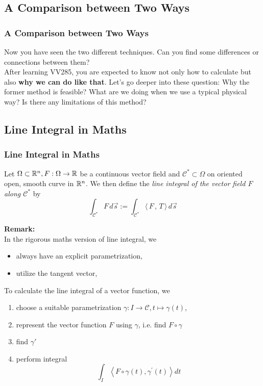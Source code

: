 \documentclass[11pt, t]{beamer}
\renewcommand{\emph}[1]{{\color{Turquoise3}\textsl{#1}}}
\newcommand{\nullspace}{~\\[15pt]}
\newcommand{\Remark}{\textbf{Remark: }}
\newcommand{\scp}[2]{\langle\,#1\,,\,#2\,\rangle} \newcommand{\scpp}{\langle\,\cdot\,,\,\cdot\,\rangle}
\begin{document}
\subsection{A Comparison between Two Ways}
\begin{frame}
    \frametitle{A Comparison between Two Ways}
    Now you have seen the two different techniques. Can you find some differences or connections between them?\nullspace\pause
    After learning VV285, you are expected to know not only how to calculate but also \textbf{why we can do like that}. Let's go deeper into these question: Why the former method is feasible? What are we doing when we use a typical physical way?  Is there any limitations of this method?
\end{frame}

\subsection{Line Integral in Maths}
\begin{frame}
    \frametitle{Line Integral in Maths}
    Let $\Omega\subset\mathbb{R}^n,F:\Omega\to\mathbb{R}$ be a continuous vector field and $\mathcal{C}^*\subset\Omega$ on oriented open, smooth curve in $\mathbb{R}^n$. We then define the \emph{line integral of the vector field $F$ along $\mathcal{C}^*$} by
    \begin{equation}\label{3.1.5}
        \int_{\mathcal{C}^*}F\,d\vec{s}:=
        \int_{\mathcal{C}^*}\scp{F}{T}\,d\vec{s}
    \end{equation}

    \Remark \\In the rigorous maths version of line integral, we
    \begin{itemize}
        \item always have an explicit parametrization,
        \item utilize the tangent vector,
    \end{itemize}
    To calculate the line integral of a vector function, we
    \begin{enumerate}
        \item choose a suitable parametrization $\gamma:I\to\mathcal{C},t\mapsto\gamma(t)$,
        \item represent the vector function $F$ using $\gamma$, i.e. find $F\circ\gamma$
        \item find $\gamma\prime$
        \item perform integral $$\int_{I}\left\langle F \circ \gamma(t), \gamma^{\prime}(t)\right\rangle d t$$
    \end{enumerate}
\end{frame}
\end{document}
